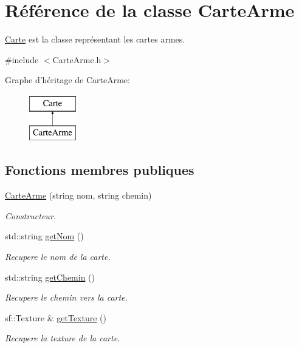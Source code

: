 \hypertarget{classCarteArme}{\section{\-Référence de la classe \-Carte\-Arme}
\label{classCarteArme}
}


\hyperlink{classCarte}{\-Carte} est la classe représentant les cartes armes.  




{\ttfamily \#include $<$\-Carte\-Arme.\-h$>$}

\-Graphe d'héritage de \-Carte\-Arme\-:\begin{figure}[H]
\begin{center}
\leavevmode
\includegraphics[height=2.000000cm]{classCarteArme}
\end{center}
\end{figure}
\subsection*{\-Fonctions membres publiques}
\begin{DoxyCompactItemize}
\item 
\hypertarget{classCarteArme_a082dcec4de4674cfc6386327dad23d2d}{\hyperlink{classCarteArme_a082dcec4de4674cfc6386327dad23d2d}{\-Carte\-Arme} (string nom, string chemin)}\label{classCarteArme_a082dcec4de4674cfc6386327dad23d2d}

\begin{DoxyCompactList}\small\item\em \-Constructeur. \end{DoxyCompactList}\item 
std\-::string \hyperlink{classCarteArme_a8f736d4e8448d65c57ce589ffb32e68d}{get\-Nom} ()
\begin{DoxyCompactList}\small\item\em \-Recupere le nom de la carte. \end{DoxyCompactList}\item 
std\-::string \hyperlink{classCarteArme_a44c430169a967b9d825644b328e03c3f}{get\-Chemin} ()
\begin{DoxyCompactList}\small\item\em \-Recupere le chemin vers la carte. \end{DoxyCompactList}\item 
sf\-::\-Texture \& \hyperlink{classCarteArme_ab0b8bfe3079c3565ccedd18a32f5c6a6}{get\-Texture} ()
\begin{DoxyCompactList}\small\item\em \-Recupere la texture de la carte. \end{DoxyCompactList}\end{DoxyCompactItemize}


